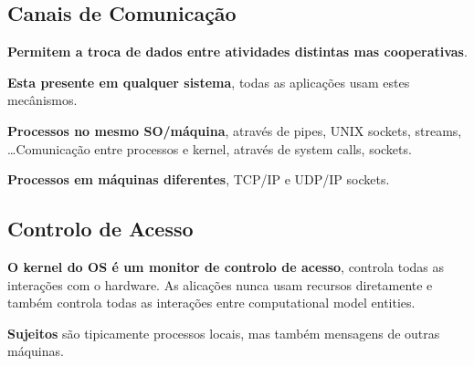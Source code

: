 \documentclass{article}
\begin{document}
\subsection{Canais de Comunicação}

\begin{flushleft}
  \textbf{Permitem a troca de dados entre atividades distintas mas cooperativas}.

  \vspace{2mm}

  \textbf{Esta presente em qualquer sistema}, todas as aplicações usam estes
  mecânismos.

  \vspace{2mm}

  \textbf{Processos no mesmo SO/máquina}, através de pipes, UNIX sockets,
  streams, \dots Comunicação entre processos e kernel, através de system calls, sockets.

  \vspace{2mm}

  \textbf{Processos em máquinas diferentes}, TCP/IP e UDP/IP sockets.
\end{flushleft}

\subsection{Controlo de Acesso}

\begin{flushleft}
  \textbf{O kernel do OS é um monitor de controlo de acesso}, controla
  todas as interações com o hardware. As alicações nunca usam recursos
  diretamente e também controla todas as interações entre computational model
  entities.

  \vspace{2mm}

  \textbf{Sujeitos} são tipicamente processos locais, mas também mensagens de outras
  máquinas.
\end{flushleft}
\end{document}
